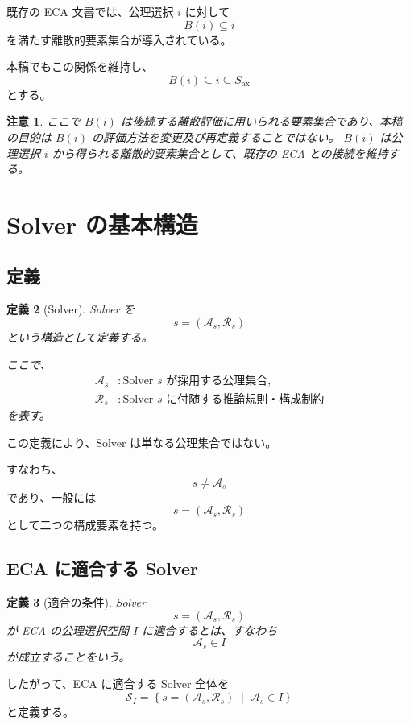 \documentclass[a4paper,11pt]{article}
\newtheorem{definition}{定義}[section]
\newtheorem{remark}[definition]{注意}
\newcommand{\Solver}{\mathcal{S}}
\newcommand{\Ax}{S_{\mathrm{ax}}}
\newcommand{\Sel}{I}
\begin{document}
既存の ECA 文書では、公理選択 $i$ に対して
\[
B(i)\subseteq i
\]
を満たす離散的要素集合が導入されている。

本稿でもこの関係を維持し、
\[
\boxed{B(i)\subseteq i\subseteq\Ax}
\]
とする。

\begin{remark}
ここで $B(i)$ は後続する離散評価に用いられる要素集合であり、本稿の目的は $B(i)$ の評価方法を変更及び再定義することではない。
$B(i)$ は公理選択 $i$ から得られる離散的要素集合として、既存の ECA との接続を維持する。
\end{remark}

\section{Solver の基本構造}

\subsection{定義}

\begin{definition}[Solver]
Solver を
\[
\boxed{
s=(\mathcal{A}_s,\mathcal{R}_s)
}
\]
という構造として定義する。

ここで、
\begin{align}
\mathcal{A}_s &: \text{Solver $s$ が採用する公理集合},\\
\mathcal{R}_s &: \text{Solver $s$ に付随する推論規則・構成制約}
\end{align}
を表す。
\end{definition}

この定義により、Solver は単なる公理集合ではない。

すなわち、
\[
s\neq\mathcal{A}_s
\]
であり、一般には
\[
s=(\mathcal{A}_s,\mathcal{R}_s)
\]
として二つの構成要素を持つ。

\subsection{ECA に適合する Solver}

\begin{definition}[適合の条件]
Solver
\[
s=(\mathcal{A}_s,\mathcal{R}_s)
\]
が ECA の公理選択空間 $\Sel$ に適合するとは、すなわち
\[
\boxed{
\mathcal{A}_s\in\Sel
}
\]
が成立することをいう。
\end{definition}

したがって、ECA に適合する Solver 全体を
\[
\boxed{
\Solver_{\Sel}
=
\left\{
s=(\mathcal{A}_s,\mathcal{R}_s)
\;\middle|\;
\mathcal{A}_s\in\Sel
\right\}
}
\]
と定義する。
\end{document}
